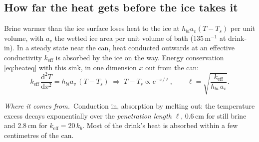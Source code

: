 \documentclass[11pt,a4paper]{article}
\newcommand{\where}{\par\noindent\textit{Where it comes from.}\ }
\begin{document}
\subsection{How far the heat gets before the ice takes it}
\label{sec:penetration}
Brine warmer than the ice surface loses heat to the ice at $h_{bi}a_v(T - T_s)$ per unit volume, with
$a_v$ the wetted ice area per unit volume of bath (135\,m$^{-1}$ at drink-in). In a steady state near
the can, heat conducted outwards at an effective conductivity $k_{\text{eff}}$ is absorbed by the ice
on the way. Energy conservation \eqref{eq:heateq} with this sink, in one dimension $x$ out from the can:
\begin{equation}
k_{\text{eff}}\,\frac{\mathrm d^2T}{\mathrm dx^2} = h_{bi}a_v\,(T - T_s)
\;\Longrightarrow\;
T - T_s \propto e^{-x/\ell},\qquad
\ell = \sqrt{\frac{k_{\text{eff}}}{h_{bi}\,a_v}} .
\label{eq:pen}
\end{equation}
\where Conduction in, absorption by melting out: the temperature excess decays exponentially over the
\emph{penetration length} $\ell$, 0.6\,cm for still brine and 2.8\,cm for $k_{\text{eff}} = 20\,k_b$. Most
of the drink's heat is absorbed within a few centimetres of the can.
\end{document}
